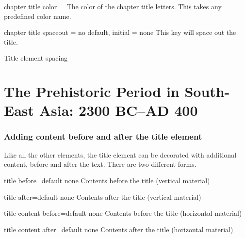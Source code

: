 \begin{decription}
\begin{docKey}[phd]{chapter title color} { = } {}
The color of the chapter title letters. This takes any predefined color name. 
\end{docKey}


\begin{docKey}[phd]{chapter title spaceout}{ = } {no default, initial = none}
 This key will space out the title. 
\end{docKey}

\begin{texexample}{Title element spacing}{}
\chapter{The Prehistoric Period in South-East Asia: 2300 BC--AD 400}        
\lorem 
    
\end{texexample}


\subsection*{Adding content before and after the title element}

Like all the other elements, the title element can be decorated with additional content,
before and after the text. There are two different forms. 

\begin{docKey}[phd]{title before}{=}{default none}
Contents before the title (vertical material)
\end{docKey}

\begin{docKey}[phd]{title after}{=}{default none}
Contents after the title (vertical material)
\end{docKey}

\begin{docKey}[phd]{title content before}{=}{default none}
Contents before the title (horizontal material)
\end{docKey}

\begin{docKey}[phd]{title content after}{=}{default none}
Contents after the title (horizontal material)
\end{docKey}


\end{decription}
